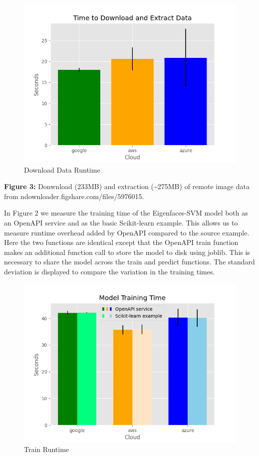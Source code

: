 \begin{figure}
\centering
\includegraphics{../images/sample_graph_1.png}
\caption{Download Data Runtime}
\end{figure}

\textbf{Figure 3:} Donwnload (233MB) and extraction
(\textasciitilde275MB) of remote image data from
ndownloader.figshare.com/files/5976015.

In Figure 2 we measure the training time of the Eigenfaces-SVM model
both as an OpenAPI service and as the basic Scikit-learn example. This
allows us to measure runtime overhead added by OpenAPI compared to the
source example. Here the two functions are identical except that the
OpenAPI train function makes an additional function call to store the
model to disk using joblib. This is necessary to share the model across
the train and predict functions. The standard deviation is displayed to
compare the variation in the training times.

\begin{figure}
\centering
\includegraphics{../images/sample_graph_2.png}
\caption{Train Runtime}
\end{figure}

